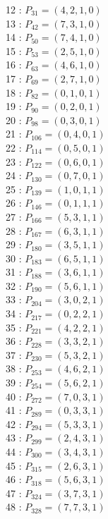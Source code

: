 \documentclass{article}
\begin{document}
{\begin{multicols}{3}
12 : $P_{31}=( 4, 2, 1, 0 )$\\
13 : $P_{42}=( 7, 3, 1, 0 )$\\
14 : $P_{50}=( 7, 4, 1, 0 )$\\
15 : $P_{53}=( 2, 5, 1, 0 )$\\
16 : $P_{63}=( 4, 6, 1, 0 )$\\
17 : $P_{69}=( 2, 7, 1, 0 )$\\
18 : $P_{82}=( 0, 1, 0, 1 )$\\
19 : $P_{90}=( 0, 2, 0, 1 )$\\
20 : $P_{98}=( 0, 3, 0, 1 )$\\
21 : $P_{106}=( 0, 4, 0, 1 )$\\
22 : $P_{114}=( 0, 5, 0, 1 )$\\
23 : $P_{122}=( 0, 6, 0, 1 )$\\
24 : $P_{130}=( 0, 7, 0, 1 )$\\
25 : $P_{139}=( 1, 0, 1, 1 )$\\
26 : $P_{146}=( 0, 1, 1, 1 )$\\
27 : $P_{166}=( 5, 3, 1, 1 )$\\
28 : $P_{167}=( 6, 3, 1, 1 )$\\
29 : $P_{180}=( 3, 5, 1, 1 )$\\
30 : $P_{183}=( 6, 5, 1, 1 )$\\
31 : $P_{188}=( 3, 6, 1, 1 )$\\
32 : $P_{190}=( 5, 6, 1, 1 )$\\
33 : $P_{204}=( 3, 0, 2, 1 )$\\
34 : $P_{217}=( 0, 2, 2, 1 )$\\
35 : $P_{221}=( 4, 2, 2, 1 )$\\
36 : $P_{228}=( 3, 3, 2, 1 )$\\
37 : $P_{230}=( 5, 3, 2, 1 )$\\
38 : $P_{253}=( 4, 6, 2, 1 )$\\
39 : $P_{254}=( 5, 6, 2, 1 )$\\
40 : $P_{272}=( 7, 0, 3, 1 )$\\
41 : $P_{289}=( 0, 3, 3, 1 )$\\
42 : $P_{294}=( 5, 3, 3, 1 )$\\
43 : $P_{299}=( 2, 4, 3, 1 )$\\
44 : $P_{300}=( 3, 4, 3, 1 )$\\
45 : $P_{315}=( 2, 6, 3, 1 )$\\
46 : $P_{318}=( 5, 6, 3, 1 )$\\
47 : $P_{324}=( 3, 7, 3, 1 )$\\
48 : $P_{328}=( 7, 7, 3, 1 )$\\

\end{multicols}}
\end{document}
